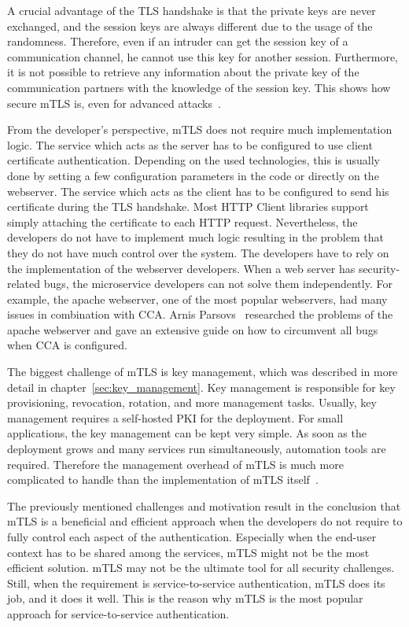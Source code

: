 A crucial advantage of the TLS handshake is that the private keys are never exchanged, and the session keys are always different due to the usage of the randomness.
Therefore, even if an intruder can get the session key of a communication channel, he cannot use this key for another session.
Furthermore, it is not possible to retrieve any information about the private key of the communication partners with the knowledge of the session key.
This shows how secure mTLS is, even for advanced attacks~\cite{parsovs2013practical}.

From the developer's perspective, mTLS does not require much implementation logic.
The service which acts as the server has to be configured to use client certificate authentication.
Depending on the used technologies, this is usually done by setting a few configuration parameters in the code or directly on the webserver.
The service which acts as the client has to be configured to send his certificate during the TLS handshake.
Most HTTP Client libraries support simply attaching the certificate to each HTTP request.
Nevertheless, the developers do not have to implement much logic resulting in the problem that they do not have much control over the system.
The developers have to rely on the implementation of the webserver developers.
When a web server has security-related bugs, the microservice developers can not solve them independently.
For example, the apache webserver, one of the most popular webservers, had many issues in combination with CCA.
Arnis Parsovs~\cite{parsovs2013practical} researched the problems of the apache webserver and gave an extensive guide on how to circumvent all bugs when CCA is configured.

The biggest challenge of mTLS is key management, which was described in more detail in chapter~\ref{sec:key_management}.
Key management is responsible for key provisioning, revocation, rotation, and more management tasks.
Usually, key management requires a self-hosted PKI for the deployment.
For small applications, the key management can be kept very simple.
As soon as the deployment grows and many services run simultaneously, automation tools are required.
Therefore the management overhead of mTLS is much more complicated to handle than the implementation of mTLS itself~\cite{dias2020microservices}.

The previously mentioned challenges and motivation result in the conclusion that mTLS is a beneficial and efficient approach when the developers do not require to fully control each aspect of the authentication.
Especially when the end-user context has to be shared among the services, mTLS might not be the most efficient solution.
mTLS may not be the ultimate tool for all security challenges.
Still, when the requirement is service-to-service authentication, mTLS does its job, and it does it well.
This is the reason why mTLS is the most popular approach for service-to-service authentication.

